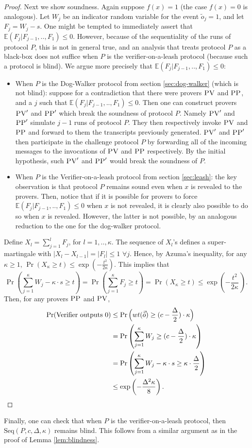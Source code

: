\begin{proof}
Next we show soundness.
Again suppose $f(x) = 1$ (the case $f(x) = 0$ is analogous). Let $W_j$ be an indicator random variable for the event $\tilde{o}_j = 1$, and let $F_j = W_j - s$. One might be tempted to immediately assert that $\mathbb{E}(F_j|F_{j-1},..,F_1) \leq 0$. However, because of the sequentiality of the runs of protocol $P$, this is not in general true, and an analysis that treats protocol $P$ as a black-box does not suffice when $P$ is the verifier-on-a-leash protocol (because such a protocol is blind). We argue more precisely that $\mathbb{E}(F_j|F_{j-1},..,F_1) \leq 0$:
\begin{itemize}
    \item When $P$ is the Dog-Walker protocol from section \ref{sec:dog-walker} (which is not blind): suppose for a contradiction that there were provers $\textsc{PV}$ and $\textsc{PP}$, and a $j$ such that $\mathbb{E}(F_j|F_{j-1},..,F_1) \leq 0$. Then one can construct provers $\textsc{PV}'$ and $\textsc{PP}'$ which break the soundness of protocol $P$. Namely $\textsc{PV}'$ and $\textsc{PP}'$ simulate $j-1$ runs of protocol $P$. They then respectively invoke $\textsc{PV}$ and $\textsc{PP}$ and forward to them the transcripts previously generated. $\textsc{PV}'$ and $\textsc{PP}'$ then participate in the challenge protocol $P$ by forwarding all of the incoming messages to the invocations of $\textsc{PV}$ and $\textsc{PP}$ respectively. By the initial hypothesis, such $\textsc{PV}'$ and $\textsc{PP}'$ would break the soundness of $P$.
    \item When $P$ is the Verifier-on-a-leash protocol from section \ref{sec:leash}: the key observation is that protocol $P$ remains sound even when $x$ is revealed to the provers. Then, notice that if it is possible for provers to force $\mathbb{E}(F_j|F_{j-1},..,F_1) \leq 0$ when $x$ is not revealed, it is clearly also possible to do so when $x$ is revealed. However, the latter is not possible, by an analogous reduction to the one for the dog-walker protocol. 
\end{itemize}
Define $X_l = \sum_{j=1}^l F_j$, for $l=1,..,\kappa$. The sequence of $X_l$'s defines a super-martingale with $|X_l-X_{l-1}| = |F_l| \leq 1 \,\, \forall j$.  Hence, by Azuma's inequality, for any $\kappa\geq 1$, $\Pr(X_\kappa \geq t) \leq \exp(-\frac{t^2}{2\kappa})$. This implies that 
\begin{equation*}
\Pr \left(\sum_{j=1}^{\kappa} W_j - \kappa \cdot s \geq t \right) = \Pr \left(\sum_{j=1}^{\kappa}F_j \geq t \right) = \Pr \left(X_{\kappa} \geq t \right) \leq \exp\left(-\frac{t^2}{2\kappa}\, \right).
\end{equation*}
Then, for any provers $\textsc{PP}$ and $\textsc{PV}$,
\begin{align*}
\Pr(\mbox{Verifier outputs $0$}) &\leq \Pr \Big(wt(\vec{\tilde{o}}) \geq (c - \frac{\Delta}{2})\cdot \kappa \Big) \\
&= \Pr \left(\sum_{j=1}^\kappa W_j \geq (c - \frac{\Delta}{2})\cdot \kappa \right) \\
&= \Pr \left(\sum_{j=1}^{\kappa} W_j - \kappa \cdot s \geq \kappa \cdot \frac{\Delta}{2} \right) \\
&\leq \exp \left(-\frac{\Delta^2\kappa}{8}\right). \qedhere
\end{align*}
\end{proof}
 Finally, one can check that when $P$ is the verifier-on-a-leash protocol, then $\mbox{Seq}(P,c,\Delta, \kappa)$ remains blind. This follows from a similar argument as in the proof of Lemma \ref{lem:blindness}.

